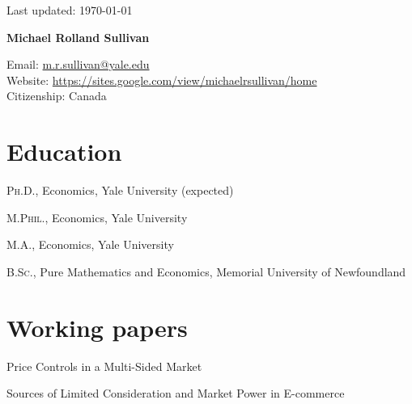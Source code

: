 \documentclass[11pt]{article} %
\begin{document}
 \begin{flushright}
   \scriptsize
	Last updated: \today
   \normalsize
\end{flushright}
{\LARGE\bfseries Michael Rolland Sullivan} %
\bigskip\bigskip\medskip %

\medskip %

Email: \href{mailto:m.r.sullivan@yale.edu}{m.r.sullivan@yale.edu}\\ 
Website: \href{https://sites.google.com/view/michaelrsullivan/home}{https://sites.google.com/view/michaelrsullivan/home}\\ 

Citizenship: Canada 

%

\section*{Education}

\textsc{Ph.D.}, Economics, Yale University (expected)

\textsc{M.Phil.}, Economics, Yale University 

\textsc{M.A.}, Economics, Yale University 

\textsc{B.Sc.}, Pure Mathematics and Economics, Memorial University of Newfoundland

\section*{Working papers}


 Price Controls in a Multi-Sided Market
\medskip

 Sources of Limited Consideration and Market Power in E-commerce
\medskip
\end{document}
